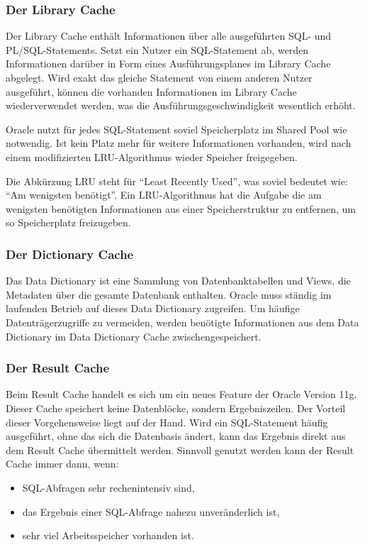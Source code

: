         \subsubsection{Der Library Cache}
          Der Library Cache enthält Informationen über alle ausgeführten
          SQL- und PL/SQL-Statements. Setzt ein Nutzer ein SQL-Statement ab,
          werden Informationen darüber in Form eines Ausführungsplanes im
          Library Cache abgelegt. Wird exakt das gleiche Statement von einem
          anderen Nutzer ausgeführt, können die vorhanden Informationen im
          Library Cache wiederverwendet werden, was die
          Ausführungsgeschwindigkeit wesentlich erhöht.

          Oracle nutzt für jedes SQL-Statement soviel Speicherplatz im Shared
          Pool wie notwendig. Ist kein Platz mehr für weitere Informationen
          vorhanden, wird nach einem modifizierten LRU-Algorithmus wieder
          Speicher freigegeben.

          \begin{merke}
            Die Abkürzung LRU steht für \enquote{Least Recently Used}, was
            soviel bedeutet wie: \enquote{Am wenigsten benötigt}. Ein
            LRU-Algorithmus hat die Aufgabe die am wenigsten benötigten
            Informationen aus einer Speicherstruktur zu entfernen, um so
            Speicherplatz freizugeben.
          \end{merke}
        \subsubsection{Der Dictionary Cache}
          Das Data Dictionary ist eine Sammlung von Datenbanktabellen und Views, die Metadaten über die gesamte Datenbank enthalten. Oracle muss ständig im laufenden Betrieb auf dieses Data Dictionary zugreifen. Um häufige Datenträgerzugriffe zu vermeiden, werden benötigte Informationen aus dem Data Dictionary im Data Dictionary Cache zwischengespeichert.
        \subsubsection{Der Result Cache}
          Beim Result Cache handelt es sich um ein neues Feature der Oracle Version 11g. Dieser Cache speichert keine Datenblöcke, sondern Ergebniszeilen. Der Vorteil dieser Vorgehensweise liegt auf der Hand.
          Wird ein SQL-Statement häufig ausgeführt, ohne das sich die Datenbasis ändert, kann das Ergebnis direkt aus dem Result Cache übermittelt werden. Sinnvoll genutzt werden kann der Result Cache immer dann, wenn:
          \begin{itemize}
            \item SQL-Abfragen sehr rechenintensiv sind,
            \item das Ergebnis einer SQL-Abfrage nahezu unveränderlich ist,
            \item sehr viel Arbeitsspeicher vorhanden ist.
          \end{itemize}
